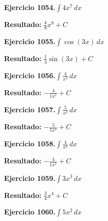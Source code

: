 \documentclass[10pt,a4paper]{article}
\begin{document}
\newpage
\begin{ejbox}
\textbf{Ejercicio 1054.}\quad $\int 4x^{7}\,dx$
\end{ejbox}

\begin{solbox}
\textbf{Resultado:} \(\displaystyle \frac{4}{8}x^{8} + C\)
\end{solbox}

\begin{ejbox}
\textbf{Ejercicio 1055.}\quad $\int \cos(3x)\,dx$
\end{ejbox}

\begin{solbox}
\textbf{Resultado:} \(\displaystyle \frac{1}{3}\sin(3x) + C\)
\end{solbox}

\begin{ejbox}
\textbf{Ejercicio 1056.}\quad $\int \frac{4}{x^{2}}\,dx$
\end{ejbox}

\begin{solbox}
\textbf{Resultado:} \(\displaystyle -\frac{4}{1x^{1}} + C\)
\end{solbox}

\newpage
\begin{ejbox}
\textbf{Ejercicio 1057.}\quad $\int \frac{5}{x^{2}}\,dx$
\end{ejbox}

\begin{solbox}
\textbf{Resultado:} \(\displaystyle -\frac{5}{1x^{1}} + C\)
\end{solbox}

\begin{ejbox}
\textbf{Ejercicio 1058.}\quad $\int \frac{4}{x^{2}}\,dx$
\end{ejbox}

\begin{solbox}
\textbf{Resultado:} \(\displaystyle -\frac{4}{1x^{1}} + C\)
\end{solbox}

\begin{ejbox}
\textbf{Ejercicio 1059.}\quad $\int 3x^{3}\,dx$
\end{ejbox}

\begin{solbox}
\textbf{Resultado:} \(\displaystyle \frac{3}{4}x^{4} + C\)
\end{solbox}

\newpage
\begin{ejbox}
\textbf{Ejercicio 1060.}\quad $\int 5x^{2}\,dx$
\end{ejbox}
\end{document}
